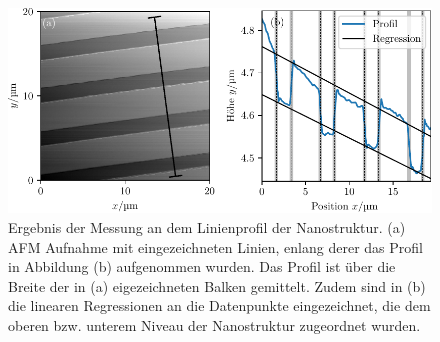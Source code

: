 \begin{figure}
  \centering
  \includegraphics[scale = 1]{../analysis/data/nanostruktur_linien/linien_profil.pdf}
  \caption{Ergebnis der Messung an dem Linienprofil der Nanostruktur. (a) AFM Aufnahme mit eingezeichneten
  Linien, enlang derer das Profil in Abbildung (b) aufgenommen wurden. Das Profil ist
  über die Breite der in (a) eigezeichneten Balken gemittelt. Zudem sind in (b) die linearen Regressionen
  an die Datenpunkte eingezeichnet, die dem oberen bzw. unterem Niveau der Nanostruktur zugeordnet wurden.}
  \label{fig: linien_profil}
\end{figure}

